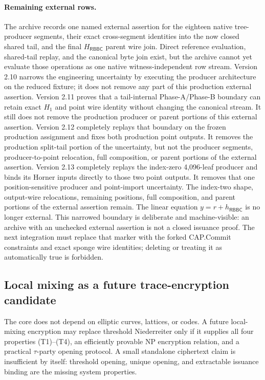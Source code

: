 \documentclass[11pt]{article}
\newcommand{\RBBC}{\mathsf{RBBC}}
\begin{document}
\paragraph{Remaining external rows.}
The archive records one named external assertion for the eighteen native
tree-producer segments, their exact cross-segment identities into the now
closed shared tail, and the final $H_{\RBBC}$ parent wire join.  Direct
reference evaluation, shared-tail replay, and the canonical byte join exist,
but the archive cannot yet evaluate those operations as one native
witness-independent row stream.
Version 2.10 narrows the engineering uncertainty by executing the producer
architecture on the reduced fixture; it does not remove any part of this
production external assertion.
Version 2.11 proves that a tail-internal Phase-A/Phase-B boundary can retain
exact $H_1$ and point wire identity without changing the canonical stream.  It
still does not remove the production producer or parent portions of this
external assertion.
Version 2.12 completely replays that boundary on the frozen production
assignment and fixes both production point outputs.  It removes the production
split-tail portion of the uncertainty, but not the producer segments,
producer-to-point relocation, full composition, or parent portions of the
external assertion.
Version 2.13 completely replays the index-zero 4,096-leaf producer and binds
its Horner inputs directly to those two point outputs.  It removes that one
position-sensitive producer and point-import uncertainty.  The index-two
shape, output-wire relocations, remaining positions, full composition, and
parent portions of the external assertion remain.
The linear equation $y=r+h_{\RBBC}$ is no longer external.  This narrowed
boundary is deliberate and machine-visible: an archive with an unchecked
external assertion is not a closed issuance proof.  The next integration must
replace that marker with the forked CAP.Commit constraints and exact sponge
wire identities; deleting or
treating it as automatically true is forbidden.

\subsection{Local mixing as a future trace-encryption candidate}

The core does not depend on elliptic curves, lattices, or codes.  A future
local-mixing encryption may replace threshold Niederreiter only if it supplies
all four properties (T1)--(T4), an efficiently provable NP encryption relation,
and a practical $\tau$-party opening protocol.  A small standalone ciphertext
claim is insufficient by itself: threshold opening, unique opening, and
extractable issuance binding are the missing system properties.
\end{document}

